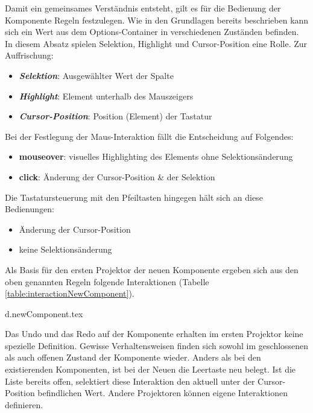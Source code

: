 Damit ein gemeinsames Verständnis entsteht, gilt es für die Bedienung der Komponente Regeln festzulegen. 
Wie in den Grundlagen bereits beschrieben kann sich ein Wert aus dem Options-Container in verschiedenen Zuständen befinden. 
In diesem Absatz spielen Selektion, Highlight und Cursor-Position eine Rolle. 
Zur Auffrischung: 

\begin{itemize}
    \item \textbf{\emph{Selektion}}: Ausgewählter Wert der Spalte
    \item \textbf{\emph{Highlight}}: Element unterhalb des Mauszeigers
    \item \textbf{\emph{Cursor-Position}}: Position (Element) der Tastatur
\end{itemize}

\noindent
Bei der Festlegung der Maus-Interaktion fällt die Entscheidung auf Folgendes: 

\begin{itemize}
    \item \textbf{mouseover}: visuelles Highlighting des Elements ohne Selektionsänderung
    \item \textbf{click}: Änderung der Cursor-Position \& der Selektion
\end{itemize}

\noindent
Die Tastatursteuerung mit den Pfeiltasten hingegen hält sich an diese Bedienungen: 

\begin{itemize}
    \item Änderung der Cursor-Position
    \item keine Selektionsänderung
\end{itemize}

\noindent
Als Basis für den ersten Projektor der neuen Komponente ergeben sich aus den oben genannten Regeln folgende Interaktionen (Tabelle \ref{table:interactionNewComponent}). 

{d.newComponent.tex}

Das Undo und das Redo auf der Komponente erhalten im ersten Projektor keine spezielle Definition. 
Gewisse Verhaltensweisen finden sich sowohl im geschlossenen als auch offenen Zustand der Komponente wieder. 
Anders als bei den existierenden Komponenten, ist bei der Neuen die Leertaste neu belegt. 
Ist die Liste bereits offen, selektiert diese Interaktion den aktuell unter der Cursor-Position befindlichen Wert. 
Andere Projektoren können eigene Interaktionen definieren. 


